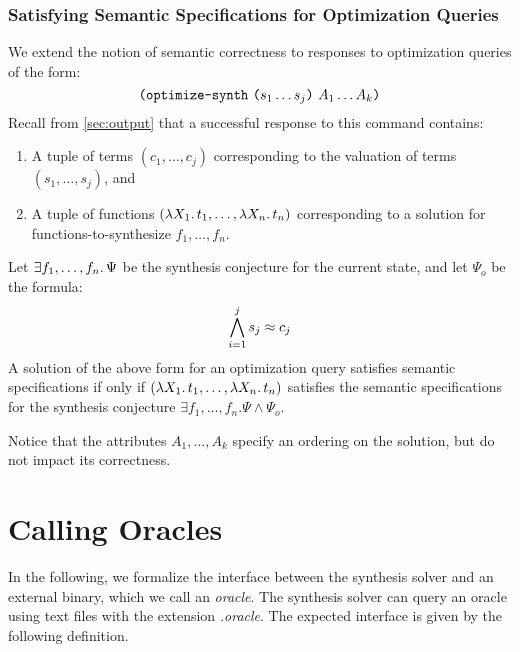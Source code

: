 \documentclass[english,a4paper,10pt]{article}
\begin{document}
\subsubsection{Satisfying Semantic Specifications for Optimization Queries}
We extend the notion of semantic correctness to responses to optimization
queries of the form:
\[
\texttt{(}\texttt{optimize-synth}\mbox{ }\texttt{(}s_1 \ldots s_j\texttt{)}\mbox{ } A_1 \ldots A_k\texttt{)}
\]
Recall from \cref{sec:output} that a successful response to this command
contains:
\begin{enumerate}
\item A tuple of terms $(c_1, \ldots, c_j)$ corresponding to the valuation of terms $(s_1, \ldots, s_j)$, and
\item A tuple of functions $( \lambda X_1 \ldotp t_1, \ldots, \lambda X_n \ldotp t_n)$
corresponding to a solution for functions-to-synthesize $f_1, \ldots, f_n$.
\end{enumerate}
Let $\exists f_1, \ldots, f_n \ldotp\Psi$ be the synthesis conjecture
for the current state, and let $\Psi_{o}$ be the formula:
\[
\bigwedge_{i=1}^{j} s_j \approx c_j
\]
A solution of the above form for an optimization query
satisfies semantic specifications if only if 
$( \lambda X_1 \ldotp t_1, \ldots, \lambda X_n \ldotp t_n)$
satisfies the semantic specifications
for the synthesis conjecture $\exists f_1, \ldots, f_n. \Psi \wedge \Psi_{o}$.

Notice that the attributes $A_1, \ldots, A_k$ specify an ordering on the
solution, but do not impact its correctness.

\section{Calling Oracles}%
\label{sec:oracleimplementations}

In the following, we formalize the interface between the
synthesis solver and an external binary, which we call an \emph{oracle}.
The synthesis solver can query an oracle using text files with the extension
\textit{.oracle}.
The expected interface is given by the following definition.
\end{document}
